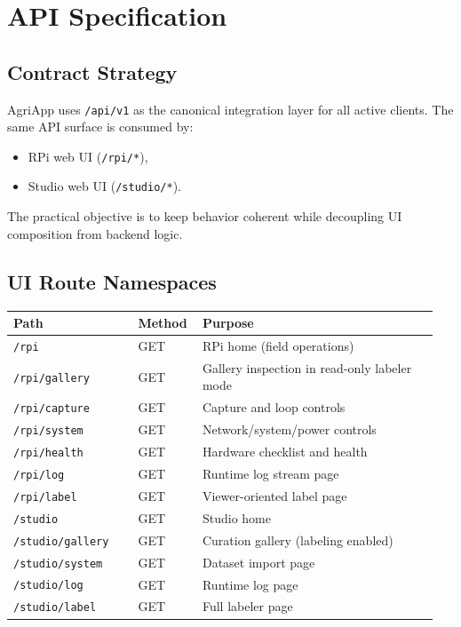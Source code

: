 \section{API Specification}

\subsection{Contract Strategy}
AgriApp uses \texttt{/api/v1} as the canonical integration layer for all active clients. The same API surface is consumed by:
\begin{itemize}
  \item RPi web UI (\texttt{/rpi/*}),
  \item Studio web UI (\texttt{/studio/*}).
\end{itemize}

The practical objective is to keep behavior coherent while decoupling UI composition from backend logic.

\subsection{UI Route Namespaces}
\begin{longtable}{p{0.28\linewidth} p{0.14\linewidth} p{0.53\linewidth}}
\toprule
Path & Method & Purpose \\
\midrule
\texttt{/rpi} & GET & RPi home (field operations) \\
\texttt{/rpi/gallery} & GET & Gallery inspection in read-only labeler mode \\
\texttt{/rpi/capture} & GET & Capture and loop controls \\
\texttt{/rpi/system} & GET & Network/system/power controls \\
\texttt{/rpi/health} & GET & Hardware checklist and health \\
\texttt{/rpi/log} & GET & Runtime log stream page \\
\texttt{/rpi/label} & GET & Viewer-oriented label page \\
\texttt{/studio} & GET & Studio home \\
\texttt{/studio/gallery} & GET & Curation gallery (labeling enabled) \\
\texttt{/studio/system} & GET & Dataset import page \\
\texttt{/studio/log} & GET & Runtime log page \\
\texttt{/studio/label} & GET & Full labeler page \\
\bottomrule
\end{longtable}

